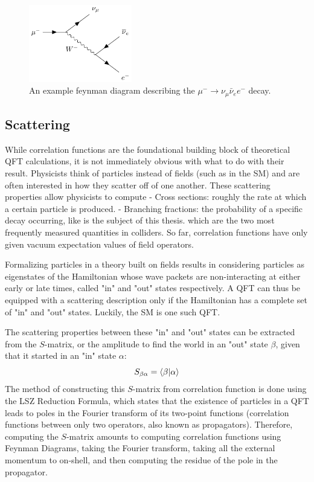 \begin{figure}[ht!]
    \centering
    \includegraphics[width=0.4\textwidth]{figures/chapter2/example_feynman_diagram.png}
    \caption{An example feynman diagram describing the $\mu^- \to \nu_\mu \bar{\nu}_e e^-$ decay.}
    \label{fig:example_feynman_diagram}
\end{figure}



\subsection{Scattering}

While correlation functions are the foundational building block of theoretical QFT calculations, it is not immediately obvious with what to do with their result. Physicists think of particles instead of fields (such as in the SM) and are often interested in how they scatter off of one another. These scattering properties allow physicists to compute 
- Cross sections: roughly the rate at which a certain particle is produced.
- Branching fractions: the probability of a specific decay occurring, like is the subject of this thesis. 
which are the two most frequently measured quantities in colliders. So far, correlation functions have only given vacuum expectation values of field operators. 

Formalizing particles in a theory built on fields results in considering particles as eigenstates of the Hamiltonian whose wave packets are non-interacting at either early or late times, called "in" and "out" states respectively. A QFT can thus be equipped with a scattering description only if the Hamiltonian has a complete set of "in" and "out" states. Luckily, the SM is one such QFT.

The scattering properties between these "in" and "out" states can be extracted from the $S$-matrix, or the amplitude to find the world in an "out" state $\beta$, given that it started in an "in" state $\alpha$:
\begin{equation}
S_{\beta \alpha} = \braket{\beta|\alpha}   
\end{equation}
The method of constructing this $S$-matrix from correlation function is done using the LSZ Reduction Formula, which states that the existence of particles in a QFT leads to poles in the Fourier transform of its two-point functions (correlation functions between only two operators, also known as propagators). Therefore, computing the $S$-matrix amounts to computing correlation functions using Feynman Diagrams, taking the Fourier transform, taking all the external momentum to on-shell, and then computing the residue of the pole in the propagator. 

